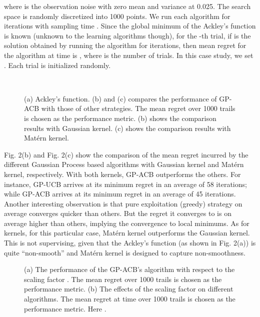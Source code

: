 \documentclass[10pt]{article}
\theoremstyle{plain}
\begin{document}
where  is the observation noise with zero mean and variance  at 0.025. The search space  is randomly discretized into 1000 points. We run each algorithm for  iterations with sampling time . Since the global minimum of the Ackley's function  is known (unknown to the learning algorithms though), for the -th trial, if  is the solution obtained by running the algorithm for  iterations, then mean regret for the algorithm at time  is , where  is the number of trials. In this case study, we set . Each trial is initialized randomly. 

\begin{figure}[!htb]
\label{fig: comparison of regret}
\centering
{}\\
\caption{(a) Ackley's function. (b) and (c) compares the performance of GP-ACB with those of other strategies. The mean regret over 1000 trails  is chosen as the performance metric. (b) shows the comparison results with Gaussian kernel. (c) shows the comparison results with Mat\'{e}rn kernel.}
\end{figure}

Fig. 2(b) and Fig. 2(c) show the comparison of the mean regret  incurred by the different Gaussian Process based algorithms with Gaussian kernel and Mat\'{e}rn kernel, respectively. With both kernels, GP-ACB outperforms the others. For instance, GP-UCB arrives at its minimum regret in an average of 58 iterations; while GP-ACB arrives at its minimum regret in an average of 45 iterations. Another interesting observation is that pure exploitation (greedy) strategy on average converges quicker than others. But the regret it converges to is on average higher than others, implying the convergence to local minimums. As for kernels, for this particular case, Mat\'{e}rn kernel outperforms the Gaussian kernel. This is not supervising, given that the Ackley's function (as shown in Fig. 2(a)) is quite ``non-smooth'' and Mat\'{e}rn kernel is designed to capture non-smoothness. 

\begin{figure}[!htb]
\label{fig:comparison of scaling factors}
\centering
{}
\caption{(a) The performance of the GP-ACB's algorithm with respect to the scaling factor . The mean regret over 1000 trails  is chosen as the performance metric. (b) The effects of the scaling factor  on different algorithms. The mean regret at time  over 1000 trails  is chosen as the performance metric. Here .}
\end{figure}
\end{document}
